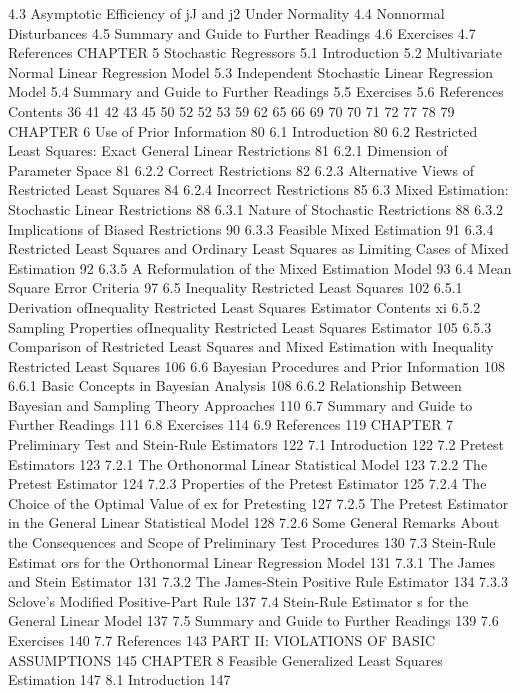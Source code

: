 4.3 Asymptotic Efficiency of jJ and {j2 Under Normality
4.4 Nonnormal Disturbances
4.5 Summary and Guide to Further Readings
4.6 Exercises
4.7 References
CHAPTER 5
Stochastic Regressors
5.1 Introduction
5.2 Multivariate Normal Linear Regression Model
5.3 Independent Stochastic Linear Regression Model
5.4 Summary and Guide to Further Readings
5.5 Exercises
5.6 References
Contents
36
41
42
43
45
50
52
52
53
59
62
65
66
69
70
70
71
72
77
78
79
CHAPTER 6
Use of Prior Information 80
6.1 Introduction 80
6.2 Restricted Least Squares: Exact General Linear Restrictions 81
6.2.1 Dimension of Parameter Space 81
6.2.2 Correct Restrictions 82
6.2.3 Alternative Views of Restricted Least Squares 84
6.2.4 Incorrect Restrictions 85
6.3 Mixed Estimation: Stochastic Linear Restrictions 88
6.3.1 Nature of Stochastic Restrictions 88
6.3.2 Implications of Biased Restrictions 90
6.3.3 Feasible Mixed Estimation 91
6.3.4 Restricted Least Squares and Ordinary Least Squares as Limiting
Cases of Mixed Estimation 92
6.3.5 A Reformulation of the Mixed Estimation Model 93
6.4 Mean Square Error Criteria 97
6.5 Inequality Restricted Least Squares 102
6.5.1 Derivation ofInequality Restricted Least Squares Estimator 
Contents xi
6.5.2 Sampling Properties ofInequality Restricted Least Squares Estimator 105
6.5.3 Comparison of Restricted Least Squares and Mixed Estimation with
Inequality Restricted Least Squares 106
6.6 Bayesian Procedures and Prior Information 108
6.6.1 Basic Concepts in Bayesian Analysis 108
6.6.2 Relationship Between Bayesian and Sampling Theory Approaches 110
6.7 Summary and Guide to Further Readings 111
6.8 Exercises 114
6.9 References 119
CHAPTER 7
Preliminary Test and Stein-Rule Estimators 122
7.1 Introduction 122
7.2 Pretest Estimators 123
7.2.1 The Orthonormal Linear Statistical Model 123
7.2.2 The Pretest Estimator 124
7.2.3 Properties of the Pretest Estimator 125
7.2.4 The Choice of the Optimal Value of ex for Pretesting 127
7.2.5 The Pretest Estimator in the General Linear Statistical Model 128
7.2.6 Some General Remarks About the Consequences and Scope of
Preliminary Test Procedures 130
7.3 Stein-Rule Estimat ors for the Orthonormal Linear Regression Model 131
7.3.1 The James and Stein Estimator 131
7.3.2 The James-Stein Positive Rule Estimator 134
7.3.3 Sclove's Modified Positive-Part Rule 137
7.4 Stein-Rule Estimator s for the General Linear Model 137
7.5 Summary and Guide to Further Readings 139
7.6 Exercises 140
7.7 References 143
PART II: VIOLATIONS OF BASIC ASSUMPTIONS 145
CHAPTER 8
Feasible Generalized Least Squares Estimation 147
8.1 Introduction 147
}
